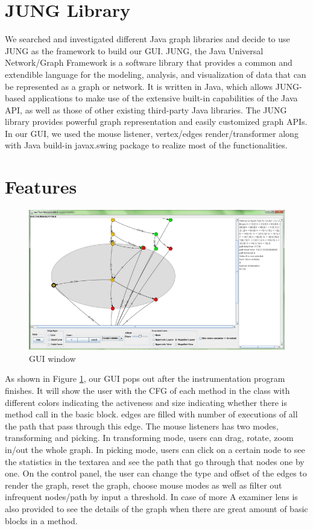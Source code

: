 \documentclass[conference,10pt,twocolumn]{./IEEE/IEEEtran}
\begin{document}
\section{JUNG Library}
We searched and investigated different Java graph libraries and decide to use JUNG as the framework to build our GUI. JUNG, the Java Universal Network/Graph Framework is a software library that provides a common and extendible language for the modeling, analysis, and visualization of data that can be represented as a graph or network. It is written in Java, which allows JUNG-based applications to make use of the extensive built-in capabilities of the Java API, as well as those of other existing third-party Java libraries. The JUNG library provides powerful graph representation and easily customized graph APIs. In our GUI, we used the mouse listener, vertex/edges render/transformer along with Java build-in javax.swing package to realize most of the functionalities. 
\section{Features}
\begin{figure}[t]
\center
  \includegraphics[scale=0.42]{gui.png}
  \caption{GUI window}
  \label{gui}
\end{figure}

As shown in Figure \ref{gui}, our GUI pops out after the instrumentation program finishes. It will show the user with the CFG of each method in the class with different colors indicating the activeness and size indicating whether there is method call in the basic block. edges are filled with number of executions of all the path that pass through this edge. The mouse listeners has two modes, transforming and picking. In transforming mode, users can drag, rotate, zoom in/out the whole graph. In picking mode, users can click on a certain node to see the statistics in the textarea and see the path that go through that nodes one by one. On the control panel, the user can change the type and offset of the edges to render the graph, reset the graph, choose mouse modes as well as filter out infrequent nodes/path by input a threshold. In case of more  A examiner lens is also provided to see the details of the graph when there are great amount of basic blocks in a method.
\end{document}
